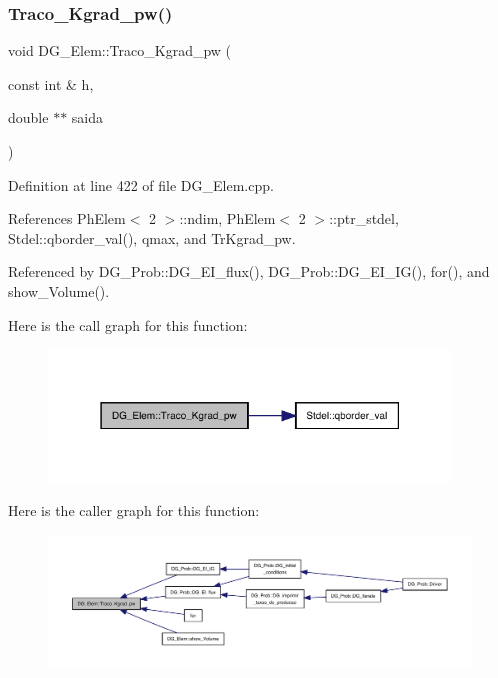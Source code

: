 \subsubsection{\texorpdfstring{Traco\+\_\+\+Kgrad\+\_\+pw()}{Traco\_Kgrad\_pw()}}
{\footnotesize\ttfamily void D\+G\+\_\+\+Elem\+::\+Traco\+\_\+\+Kgrad\+\_\+pw (\begin{DoxyParamCaption}\item[{const int \&}]{h,  }\item[{double $\ast$$\ast$}]{saida }\end{DoxyParamCaption})}



Definition at line 422 of file D\+G\+\_\+\+Elem.\+cpp.



References Ph\+Elem$<$ 2 $>$\+::ndim, Ph\+Elem$<$ 2 $>$\+::ptr\+\_\+stdel, Stdel\+::qborder\+\_\+val(), qmax, and Tr\+Kgrad\+\_\+pw.



Referenced by D\+G\+\_\+\+Prob\+::\+D\+G\+\_\+\+E\+I\+\_\+flux(), D\+G\+\_\+\+Prob\+::\+D\+G\+\_\+\+E\+I\+\_\+\+I\+G(), for(), and show\+\_\+\+Volume().

Here is the call graph for this function\+:
\nopagebreak
\begin{figure}[H]
\begin{center}
\leavevmode
\includegraphics[width=303pt]{classDG__Elem_ae98efe920078bc5fd18eceee997d44a2_cgraph}
\end{center}
\end{figure}
Here is the caller graph for this function\+:
\nopagebreak
\begin{figure}[H]
\begin{center}
\leavevmode
\includegraphics[width=350pt]{classDG__Elem_ae98efe920078bc5fd18eceee997d44a2_icgraph}
\end{center}
\end{figure}
\mbox{\label{classDG__Elem_ae64a1118040aad9dd3c18ac68b2d5d4f}} 
